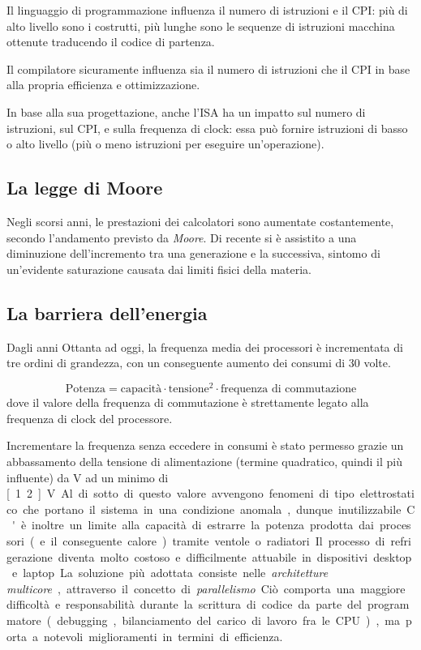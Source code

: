 \documentclass[class=book, crop=false, oneside]{standalone}
\begin{document}
Il linguaggio di programmazione influenza il numero di istruzioni e il CPI: più di alto livello sono i costrutti, più lunghe sono le sequenze di istruzioni macchina ottenute traducendo il codice di partenza.

Il compilatore sicuramente influenza sia il numero di istruzioni che il CPI in base alla propria efficienza e ottimizzazione.

In base alla sua progettazione, anche l'ISA ha un impatto sul numero di istruzioni, sul CPI, e sulla frequenza di clock: essa può fornire istruzioni di basso o alto livello (più o meno istruzioni per eseguire un'operazione).

\subsection{La legge di Moore}
Negli scorsi anni, le prestazioni dei calcolatori sono aumentate costantemente, secondo l'andamento previsto da \emph{Moore}. Di recente si è assistito a una diminuzione dell’incremento tra una generazione e la successiva, sintomo di un'evidente saturazione causata dai limiti fisici della materia.

\subsection{La barriera dell'energia}
Dagli anni Ottanta ad oggi, la frequenza media dei processori è incrementata di tre ordini di grandezza, con un conseguente aumento dei consumi di 30 volte.

\begin{equation*}
\text{Potenza} = \text{capacità} \cdot \text{tensione}^2 \cdot \text{frequenza di commutazione}
\end{equation*}
dove il valore della frequenza di commutazione è strettamente legato alla frequenza di clock del processore.

Incrementare la frequenza senza eccedere in consumi è stato permesso grazie un abbassamento della tensione di alimentazione (termine quadratico, quindi il più influente) da \unit[5]{V} ad un minimo di \unit[1.2]{V}.
Al di sotto di questo valore avvengono fenomeni di tipo elettrostatico che portano il sistema in una condizione anomala, dunque inutilizzabile.

C'è inoltre un limite alla capacità di estrarre la potenza prodotta dai processori (e il conseguente calore) tramite ventole o radiatori.
Il processo di refrigerazione diventa molto costoso e difficilmente attuabile in dispositivi desktop e laptop.

La soluzione più adottata consiste nelle \emph{architetture multicore}, attraverso il concetto di \emph{parallelismo}.
Ciò comporta una maggiore difficoltà e responsabilità durante la scrittura di codice da parte del programmatore (debugging, bilanciamento del carico di lavoro fra le CPU), ma porta a notevoli miglioramenti in termini di efficienza.
\end{document}
